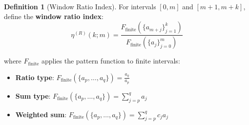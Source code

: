 \documentclass[12pt]{article}
\theoremstyle{plain}
\theoremstyle{definition}
\newtheorem{definition}[theorem]{Definition}
\begin{document}
\begin{definition}[Window Ratio Index]
For intervals $[0,m]$ and $[m+1, m+k]$, define the \textbf{window ratio index}:
$$\eta^{(R)}(k; m) = \frac{F_{\text{finite}}(\{a_{m+j}\}_{j=1}^k)}{F_{\text{finite}}(\{a_j\}_{j=0}^m)}$$

where $F_{\text{finite}}$ applies the pattern function to finite intervals:
\begin{itemize}
\item \textbf{Ratio type}: $F_{\text{finite}}(\{a_p, \ldots, a_q\}) = \frac{a_q}{a_p}$ 
\item \textbf{Sum type}: $F_{\text{finite}}(\{a_p, \ldots, a_q\}) = \sum_{j=p}^q a_j$
\item \textbf{Weighted sum}: $F_{\text{finite}}(\{a_p, \ldots, a_q\}) = \sum_{j=p}^q c_j a_j$
\end{itemize}
\end{definition}
\end{document}
